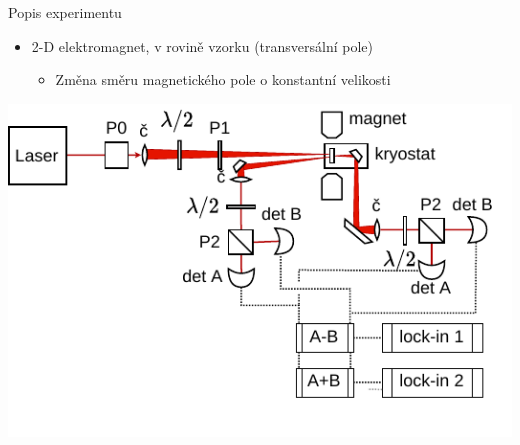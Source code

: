 \documentclass{beamer}
\begin{document}
\begin{frame}{Popis experimentu}
    \begin{itemize}
        \item 2-D elektromagnet, v rovině vzorku (transversální pole)
            \begin{itemize}
                \item Změna směru magnetického pole o konstantní velikosti
            \end{itemize}
    \end{itemize}
    \vspace{0.3cm}
    \hspace{1cm}
    \includegraphics{img/schema-hlavni.drawio.pdf}
\end{frame}
\end{document}
